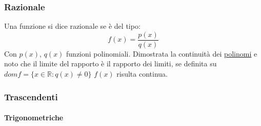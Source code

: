 \documentclass[10pt]{article}
\theoremstyle{plain}
\begin{document}
\subsubsection*{Razionale}
Una funzione si dice razionale se è del tipo:
\[f(x) = \frac{p(x)}{q(x)}\]
Con $p(x)$, $q(x)$ funzioni polinomiali. Dimostrata la continuità dei \hyperlink{contin}{polinomi} e noto che il limite del rapporto è il rapporto dei limiti, se definita su $domf = \{x \in \mathbb{R} : q(x) \neq 0\}$ $f(x)$ risulta continua.

\subsubsection*{Trascendenti}

\paragraph{Trigonometriche}
\end{document}
